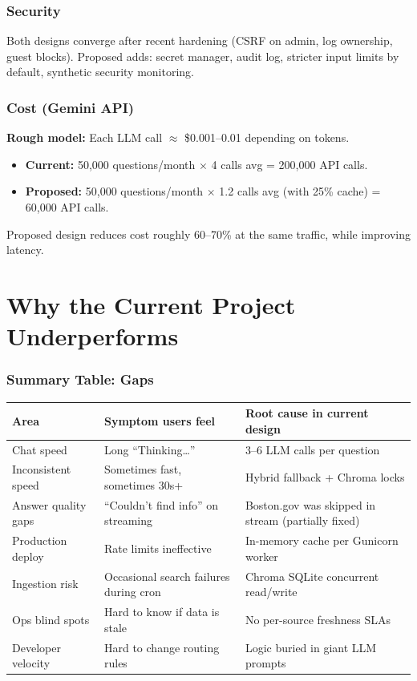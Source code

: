 \documentclass[11pt,a4paper]{article}
\begin{document}
\section{Security}

Both designs converge after recent hardening (CSRF on admin, log ownership, guest blocks). Proposed adds: secret manager, audit log, stricter input limits by default, synthetic security monitoring.

\section{Cost (Gemini API)}

\textbf{Rough model:} Each LLM call $\approx$ \$0.001--0.01 depending on tokens.

\begin{itemize}
  \item \textbf{Current:} 50,000 questions/month $\times$ 4 calls avg = 200,000 API calls.
  \item \textbf{Proposed:} 50,000 questions/month $\times$ 1.2 calls avg (with 25\% cache) = 60,000 API calls.
\end{itemize}

Proposed design reduces cost roughly 60--70\% at the same traffic, while improving latency.

\part{Why the Current Project Underperforms}

\section{Summary Table: Gaps}

\begin{table}[h]
\centering
\small
\begin{tabular}{@{}lll@{}}
\toprule
\textbf{Area} & \textbf{Symptom users feel} & \textbf{Root cause in current design} \\
\midrule
Chat speed & Long ``Thinking\ldots'' & 3--6 LLM calls per question \\
Inconsistent speed & Sometimes fast, sometimes 30s+ & Hybrid fallback + Chroma locks \\
Answer quality gaps & ``Couldn't find info'' on streaming & Boston.gov was skipped in stream (partially fixed) \\
Production deploy & Rate limits ineffective & In-memory cache per Gunicorn worker \\
Ingestion risk & Occasional search failures during cron & Chroma SQLite concurrent read/write \\
Ops blind spots & Hard to know if data is stale & No per-source freshness SLAs \\
Developer velocity & Hard to change routing rules & Logic buried in giant LLM prompts \\
\bottomrule
\end{tabular}
\end{table}
\end{document}
